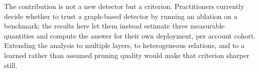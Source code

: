 \documentclass[../elsevier.tex]{subfiles}
\begin{document}
The contribution is not a new detector but a criterion. Practitioners currently
decide whether to trust a graph-based detector by running an ablation on a
benchmark; the results here let them instead estimate three measurable quantities
and compute the answer for their own deployment, per account cohort. Extending the
analysis to multiple layers, to heterogeneous relations, and to a learned rather
than assumed pruning quality would make that criterion sharper still.
\end{document}
